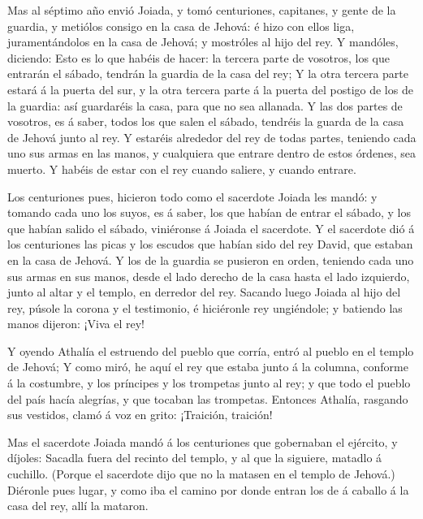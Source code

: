  Mas al séptimo año envió Joiada, y tomó centuriones,
capitanes, y gente de la guardia, y metiólos consigo en la casa de
Jehová: é hizo con ellos liga, juramentándolos en la casa de Jehová; y
mostróles al hijo del rey.  Y mandóles, diciendo: Esto es lo
que habéis de hacer: la tercera parte de vosotros, los que entrarán el
sábado, tendrán la guardia de la casa del rey;  Y la otra
tercera parte estará á la puerta del sur, y la otra tercera parte á la
puerta del postigo de los de la guardia: así guardaréis la casa, para
que no sea allanada.  Y las dos partes de vosotros, es á
saber, todos los que salen el sábado, tendréis la guarda de la casa de
Jehová junto al rey.  Y estaréis alrededor del rey de todas
partes, teniendo cada uno sus armas en las manos, y cualquiera que
entrare dentro de estos órdenes, sea muerto. Y habéis de estar con el
rey cuando saliere, y cuando entrare.

 Los centuriones pues, hicieron todo como el sacerdote
Joiada les mandó: y tomando cada uno los suyos, es á saber, los que
habían de entrar el sábado, y los que habían salido el sábado,
viniéronse á Joiada el sacerdote.  Y el sacerdote dió á los
centuriones las picas y los escudos que habían sido del rey David, que
estaban en la casa de Jehová.  Y los de la guardia se
pusieron en orden, teniendo cada uno sus armas en sus manos, desde el
lado derecho de la casa hasta el lado izquierdo, junto al altar y el
templo, en derredor del rey.  Sacando luego Joiada al hijo
del rey, púsole la corona y el testimonio, é hiciéronle rey ungiéndole;
y batiendo las manos dijeron: ¡Viva el rey!

 Y oyendo Athalía el estruendo del pueblo que corría, entró
al pueblo en el templo de Jehová;  Y como miró, he aquí el
rey que estaba junto á la columna, conforme á la costumbre, y los
príncipes y los trompetas junto al rey; y que todo el pueblo del país
hacía alegrías, y que tocaban las trompetas. Entonces Athalía, rasgando
sus vestidos, clamó á voz en grito: ¡Traición, traición!

 Mas el sacerdote Joiada mandó á los centuriones que
gobernaban el ejército, y díjoles: Sacadla fuera del recinto del templo,
y al que la siguiere, matadlo á cuchillo. (Porque el sacerdote dijo que
no la matasen en el templo de Jehová.)  Diéronle pues
lugar, y como iba el camino por donde entran los de á caballo á la casa
del rey, allí la mataron.

